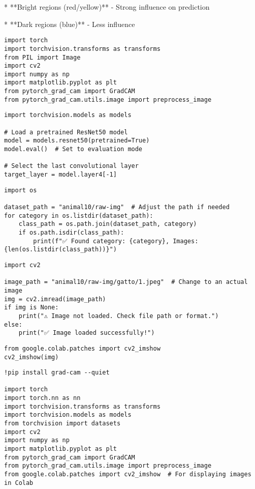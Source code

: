 \documentclass{article}
\begin{document}
* **Bright regions (red/yellow)** - Strong influence on prediction

* **Dark regions (blue)** - Less influence

\begin{verbatim}
import torch
import torchvision.transforms as transforms
from PIL import Image
import cv2
import numpy as np
import matplotlib.pyplot as plt
from pytorch_grad_cam import GradCAM
from pytorch_grad_cam.utils.image import preprocess_image

\end{verbatim}

\begin{verbatim}
import torchvision.models as models

# Load a pretrained ResNet50 model
model = models.resnet50(pretrained=True)
model.eval()  # Set to evaluation mode

# Select the last convolutional layer
target_layer = model.layer4[-1]

\end{verbatim}

\begin{verbatim}
import os

dataset_path = "animal10/raw-img"  # Adjust the path if needed
for category in os.listdir(dataset_path):
    class_path = os.path.join(dataset_path, category)
    if os.path.isdir(class_path):
        print(f"✅ Found category: {category}, Images: {len(os.listdir(class_path))}")

\end{verbatim}

\begin{verbatim}
import cv2

image_path = "animal10/raw-img/gatto/1.jpeg"  # Change to an actual image
img = cv2.imread(image_path)
if img is None:
    print("⚠️ Image not loaded. Check file path or format.")
else:
    print("✅ Image loaded successfully!")

\end{verbatim}

\begin{verbatim}
from google.colab.patches import cv2_imshow
cv2_imshow(img)

\end{verbatim}

\begin{verbatim}
!pip install grad-cam --quiet

import torch
import torch.nn as nn
import torchvision.transforms as transforms
import torchvision.models as models
from torchvision import datasets
import cv2
import numpy as np
import matplotlib.pyplot as plt
from pytorch_grad_cam import GradCAM
from pytorch_grad_cam.utils.image import preprocess_image
from google.colab.patches import cv2_imshow  # For displaying images in Colab

\end{verbatim}
\end{document}
